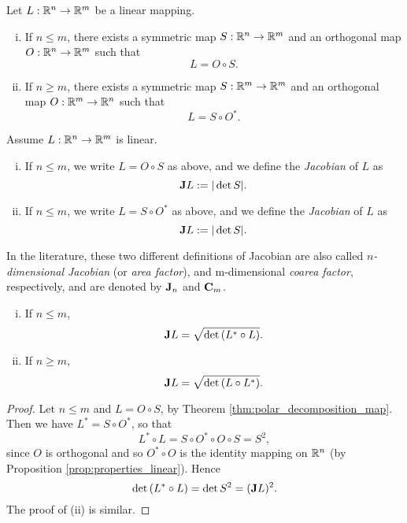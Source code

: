 \begin{theorem} \label{thm:polar_decomposition_map}
Let $L: \mathbb{R}^{n} \to \mathbb{R}^{m}$ be a linear mapping.
\begin{enumerate}[i)]
\item If $n \le m$, there exists a symmetric map $S: \mathbb{R}^{n} \to \mathbb{R}^{m}$ and an orthogonal map $O: \mathbb{R}^{n} \to \mathbb{R}^{m}$ such that $$L = O \circ S.$$
\item If $n \ge m$, there exists a symmetric map $S: \mathbb{R}^{m} \to \mathbb{R}^{m}$ and an orthogonal map $O: \mathbb{R}^{m} \to \mathbb{R}^{n}$ such that $$L = S \circ O^{*}.$$
\end{enumerate}
\end{theorem}

\begin{definition}[Jacobian]
Assume $L : \mathbb{R}^{n} \to \mathbb{R}^{m}$ is linear.
\begin{enumerate}[i)]
\item If $n \le m$, we write $L = O \circ S$ as above, and we define the {\em Jacobian} of $L$ as $${\bf J} L := |\det{S}|.$$ 
\item If $n \le m$, we write $L = S \circ O^{*}$ as above, and we define the {\em Jacobian} of $L$ as $${\bf J} L := |\det{S}|.$$ 
\end{enumerate}
\end{definition}

In the literature, these two different definitions of Jacobian are also called {\em $n$-dimensional Jacobian} (or {\em area factor}), and {m}-dimensional {\em coarea factor}, respectively, and are denoted by ${\bf J}_{n}$ and ${\bf C}_{m}$.

\begin{theorem} \hfill
\begin{enumerate}[i)]
\item If $n \le m$, $${\bf J} L = \sqrt{\det{(L^{*} \circ L)}}.$$
\item If $n \ge m$, $${\bf J} L = \sqrt{\det{(L \circ L^{*})}}.$$
\end{enumerate}
\end{theorem}
\begin{proof}
Let $n \le m$ and $L = O \circ S$, by Theorem \ref{thm:polar_decomposition_map}. Then we have $L^{*} = S \circ O^{*}$, so that $$L^{*} \circ L = S \circ O^{*} \circ O \circ S = S^{2},$$ since $O$ is orthogonal and so $O^{*} \circ O$ is the identity mapping on $\mathbb{R}^{n}$ (by Proposition \ref{prop:properties_linear}). Hence $$\det{(L^{*} \circ L)} = \det{S^{2}} = ({\bf J} L)^{2}.$$
The proof of (ii) is similar.
\end{proof}

